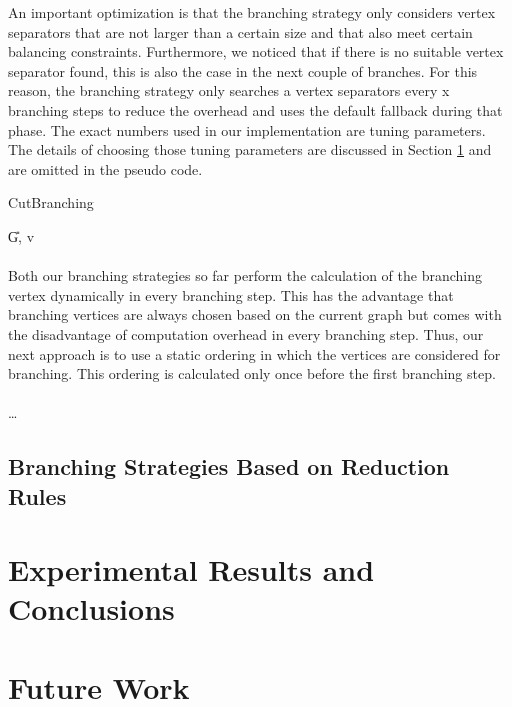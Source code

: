 \documentclass[]{article}
\begin{document}
An important optimization is that the branching strategy only considers vertex separators that are not larger than a certain size and that also meet certain balancing constraints. Furthermore, we noticed that if there is no suitable vertex separator found, this is also the case in the next couple of branches. For this reason, the branching strategy only searches a vertex separators every x branching steps to reduce the overhead and uses the default fallback during that phase. The exact numbers used in our implementation are tuning parameters. The details of choosing those tuning parameters are discussed in Section \ref{sec5} and are omitted in the pseudo code. 

\begin{algorithm}
	\caption{CutBranching}\label{alg:cut_strat}
	\DontPrintSemicolon
	
	
	\U{G, v}	
	
	
\end{algorithm}
\paragraph{}
Both our branching strategies so far perform the calculation of the branching vertex dynamically in every branching step. This has the advantage that branching vertices are always chosen based on the current graph but comes with the disadvantage of computation overhead in every branching step. Thus, our next approach is to use a static ordering in which the vertices are considered for branching. This ordering is calculated only once before the first branching step.

\paragraph{} \dots

\subsection{Branching Strategies Based on Reduction Rules} \label{red_strats}

\newpage
\section{Experimental Results and Conclusions} \label{sec5}
\section{Future Work} \label{sec6}
\newpage




\end{document}
